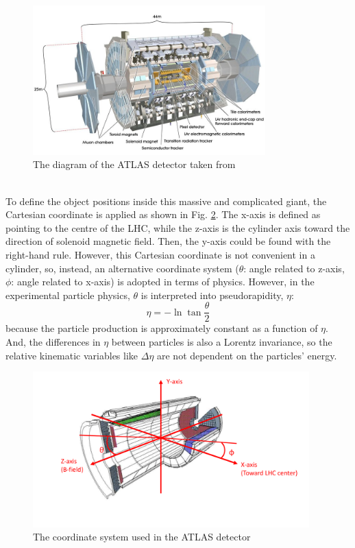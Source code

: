 \begin{figure}[!h]                
	\includegraphics[width=0.8\textwidth]{Chapter2/ATLAS.jpg}
	\centering
	\begin{center}
		\caption{The diagram of the ATLAS detector taken from \cite{Collaboration_2008}}
		\label{Fig:ATLAS}            
	\end{center}
\end{figure}
\noindent
\\To define the object positions inside this massive and complicated giant, the Cartesian coordinate is applied as shown in Fig. \ref{Fig:coordinate}. The x-axis is defined as pointing to the centre of the LHC, while the z-axis is the cylinder axis toward the direction of solenoid magnetic field. Then, the y-axis could be found with the right-hand rule. However, this Cartesian coordinate is not convenient in a cylinder, so, instead, an alternative coordinate system ($\theta$: angle related to z-axis, $\phi$: angle related to x-axis) is adopted in terms of physics. However, in the experimental particle physics, $\theta$ is interpreted into pseudorapidity, $\eta$:
\begin{equation}
\eta = -\ln{\tan{\frac{\theta}{2}}}
\end{equation}
\noindent
because the particle production is approximately constant as a function of $\eta$. And, the differences in $\eta$ between particles is also a Lorentz invariance, so the relative kinematic variables like $\Delta\eta$ are not dependent on the particles' energy. 
\begin{figure}[!h]                
	\includegraphics[width=0.95\textwidth]{Chapter2/coordinate}
	\centering
	\begin{center}
		\caption{The coordinate system used in the ATLAS detector}
		\label{Fig:coordinate}            
	\end{center}
\end{figure}
